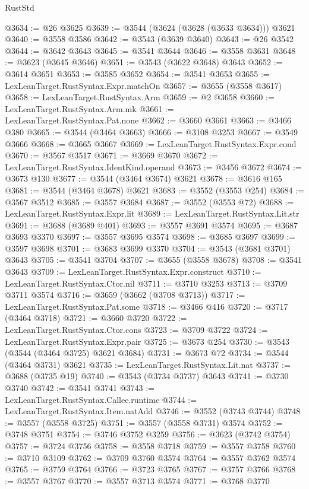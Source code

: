 \begin{lexlean}{RustStd}
\begin{coremodule}
@3634 := @26 @3625
@3639 := @3544 (@3624 (@3628 (@3633 @3634))) @3621
@3640 := @3558 @3586
@3642 := @3543 (@3639 @3640)
@3643 := @26 @3542
@3644 := @3642 @3643
@3645 := @3541 @3644
@3646 := @3558 @3631
@3648 := @3623 (@3645 @3646)
@3651 := @3543 (@3622 @3648) @3643
@3652 := @3614 @3651
@3653 := @3585 @3652
@3654 := @3541 @3653
@3655 := LexLeanTarget.RustSyntax.Expr.matchOn
@3657 := @3655 (@3558 @3617)
@3658 := LexLeanTarget.RustSyntax.Arm
@3659 := @2 @3658
@3660 := LexLeanTarget.RustSyntax.Arm.mk
@3661 := LexLeanTarget.RustSyntax.Pat.none
@3662 := @3660 @3661
@3663 := @3466 @380
@3665 := @3544 (@3464 @3663)
@3666 := @3108 @3253
@3667 := @3549 @3666
@3668 := @3665 @3667
@3669 := LexLeanTarget.RustSyntax.Expr.cond
@3670 := @3567 @3517
@3671 := @3669 @3670
@3672 := LexLeanTarget.RustSyntax.IdentKind.operand
@3673 := @3456 @3672
@3674 := @3673 @130
@3677 := @3544 (@3464 @3674) @3621
@3678 := @3616 @165
@3681 := @3544 (@3464 @3678) @3621
@3683 := @3552 (@3553 @254)
@3684 := @3567 @3512
@3685 := @3557 @3684
@3687 := @3552 (@3553 @72)
@3688 := LexLeanTarget.RustSyntax.Expr.lit
@3689 := LexLeanTarget.RustSyntax.Lit.str
@3691 := @3688 (@3689 @401)
@3693 := @3557 @3691 @3574
@3695 := @3687 @3693 @3370
@3697 := @3557 @3695 @3574
@3698 := @3685 @3697
@3699 := @3597 @3698
@3701 := @3683 @3699 @3370
@3704 := @3543 (@3681 @3701) @3643
@3705 := @3541 @3704
@3707 := @3655 (@3558 @3678)
@3708 := @3541 @3643
@3709 := LexLeanTarget.RustSyntax.Expr.construct
@3710 := LexLeanTarget.RustSyntax.Ctor.nil
@3711 := @3710 @3253
@3713 := @3709 @3711 @3574
@3716 := @3659 (@3662 (@3708 @3713))
@3717 := LexLeanTarget.RustSyntax.Pat.some
@3718 := @3466 @416
@3720 := @3717 (@3464 @3718)
@3721 := @3660 @3720
@3722 := LexLeanTarget.RustSyntax.Ctor.cons
@3723 := @3709 @3722
@3724 := LexLeanTarget.RustSyntax.Expr.pair
@3725 := @3673 @254
@3730 := @3543 (@3544 (@3464 @3725) @3621 @3684)
@3731 := @3673 @72
@3734 := @3544 (@3464 @3731) @3621
@3735 := LexLeanTarget.RustSyntax.Lit.nat
@3737 := @3688 (@3735 @19)
@3740 := @3543 (@3734 @3737) @3643
@3741 := @3730 @3740
@3742 := @3541 @3741
@3743 := LexLeanTarget.RustSyntax.Callee.runtime
@3744 := LexLeanTarget.RustSyntax.Item.natAdd
@3746 := @3552 (@3743 @3744)
@3748 := @3557 (@3558 @3725)
@3751 := @3557 (@3558 @3731) @3574
@3752 := @3748 @3751
@3754 := @3746 @3752 @3259
@3756 := @3623 (@3742 @3754)
@3757 := @3724 @3756
@3758 := @3558 @3718
@3759 := @3557 @3758
@3760 := @3710 @3109
@3762 := @3709 @3760 @3574
@3764 := @3557 @3762 @3574
@3765 := @3759 @3764
@3766 := @3723 @3765
@3767 := @3757 @3766
@3768 := @3557 @3767
@3770 := @3557 @3713 @3574
@3771 := @3768 @3770

\end{coremodule}
\end{lexlean}
